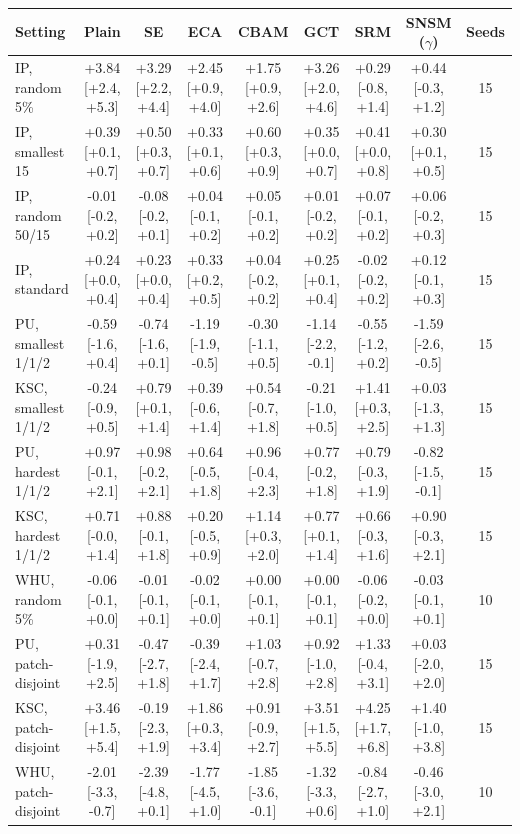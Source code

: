 \begin{tabular}{lcccccccc}
\toprule
Setting & Plain & SE & ECA & CBAM & GCT & SRM & SNSM ($\gamma$) & Seeds \\
\midrule
IP, random 5\% & +3.84 [+2.4, +5.3] & +3.29 [+2.2, +4.4] & +2.45 [+0.9, +4.0] & +1.75 [+0.9, +2.6] & +3.26 [+2.0, +4.6] & +0.29 [-0.8, +1.4] & +0.44 [-0.3, +1.2] & 15 \\
IP, smallest 15 & +0.39 [+0.1, +0.7] & +0.50 [+0.3, +0.7] & +0.33 [+0.1, +0.6] & +0.60 [+0.3, +0.9] & +0.35 [+0.0, +0.7] & +0.41 [+0.0, +0.8] & +0.30 [+0.1, +0.5] & 15 \\
IP, random 50/15 & -0.01 [-0.2, +0.2] & -0.08 [-0.2, +0.1] & +0.04 [-0.1, +0.2] & +0.05 [-0.1, +0.2] & +0.01 [-0.2, +0.2] & +0.07 [-0.1, +0.2] & +0.06 [-0.2, +0.3] & 15 \\
IP, standard & +0.24 [+0.0, +0.4] & +0.23 [+0.0, +0.4] & +0.33 [+0.2, +0.5] & +0.04 [-0.2, +0.2] & +0.25 [+0.1, +0.4] & -0.02 [-0.2, +0.2] & +0.12 [-0.1, +0.3] & 15 \\
\midrule
PU, smallest 1/1/2 & -0.59 [-1.6, +0.4] & -0.74 [-1.6, +0.1] & -1.19 [-1.9, -0.5] & -0.30 [-1.1, +0.5] & -1.14 [-2.2, -0.1] & -0.55 [-1.2, +0.2] & -1.59 [-2.6, -0.5] & 15 \\
KSC, smallest 1/1/2 & -0.24 [-0.9, +0.5] & +0.79 [+0.1, +1.4] & +0.39 [-0.6, +1.4] & +0.54 [-0.7, +1.8] & -0.21 [-1.0, +0.5] & +1.41 [+0.3, +2.5] & +0.03 [-1.3, +1.3] & 15 \\
PU, hardest 1/1/2 & +0.97 [-0.1, +2.1] & +0.98 [-0.2, +2.1] & +0.64 [-0.5, +1.8] & +0.96 [-0.4, +2.3] & +0.77 [-0.2, +1.8] & +0.79 [-0.3, +1.9] & -0.82 [-1.5, -0.1] & 15 \\
KSC, hardest 1/1/2 & +0.71 [-0.0, +1.4] & +0.88 [-0.1, +1.8] & +0.20 [-0.5, +0.9] & +1.14 [+0.3, +2.0] & +0.77 [+0.1, +1.4] & +0.66 [-0.3, +1.6] & +0.90 [-0.3, +2.1] & 15 \\
\midrule
WHU, random 5\% & -0.06 [-0.1, +0.0] & -0.01 [-0.1, +0.1] & -0.02 [-0.1, +0.0] & +0.00 [-0.1, +0.1] & +0.00 [-0.1, +0.1] & -0.06 [-0.2, +0.0] & -0.03 [-0.1, +0.1] & 10 \\
PU, patch-disjoint & +0.31 [-1.9, +2.5] & -0.47 [-2.7, +1.8] & -0.39 [-2.4, +1.7] & +1.03 [-0.7, +2.8] & +0.92 [-1.0, +2.8] & +1.33 [-0.4, +3.1] & +0.03 [-2.0, +2.0] & 15 \\
KSC, patch-disjoint & +3.46 [+1.5, +5.4] & -0.19 [-2.3, +1.9] & +1.86 [+0.3, +3.4] & +0.91 [-0.9, +2.7] & +3.51 [+1.5, +5.5] & +4.25 [+1.7, +6.8] & +1.40 [-1.0, +3.8] & 15 \\
WHU, patch-disjoint & -2.01 [-3.3, -0.7] & -2.39 [-4.8, +0.1] & -1.77 [-4.5, +1.0] & -1.85 [-3.6, -0.1] & -1.32 [-3.3, +0.6] & -0.84 [-2.7, +1.0] & -0.46 [-3.0, +2.1] & 10 \\

\end{tabular}
